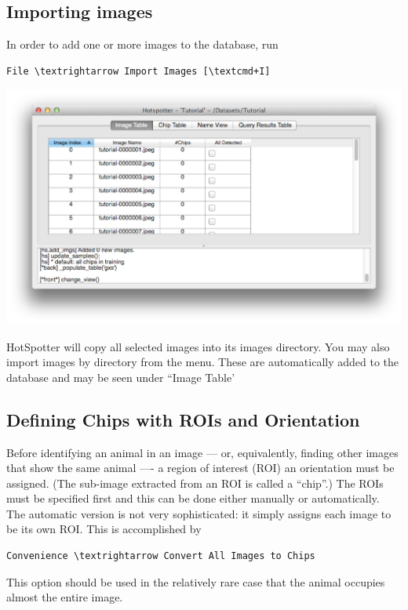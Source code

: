 \documentclass[a4paper,10pt]{article}
\begin{document}
    \subsection{Importing images}
        In order to add one or more images to the database, run
        \begin{Verbatim}[commandchars=\\\{\}]
        File \textrightarrow Import Images [\textcmd+I] 
        \end{Verbatim}
        \begin{center}
            \includegraphics[scale=0.15]{images/added.png}
        \end{center}
        HotSpotter will copy all selected images into its images directory.  You may also import images by directory from the menu.
        These are automatically added to the database and may be seen under ``Image Table'

    \subsection{Defining Chips with ROIs and Orientation}
        Before identifying an animal in an image --- or, equivalently,
        finding other images that show the same animal ---- a region
        of interest (ROI) an orientation must be assigned.  (The
        sub-image extracted from an ROI is called a ``chip''.)  The
        ROIs must be specified first and this can be done either
        manually or automatically.  The automatic version is not very
        sophisticated: it simply assigns each image to be its own ROI.
        This is accomplished by
        \begin{Verbatim}[commandchars=\\\{\}]
        Convenience \textrightarrow Convert All Images to Chips
        \end{Verbatim}
        This option should be used in the relatively rare case that the
        animal occupies almost the entire image.
\end{document}
